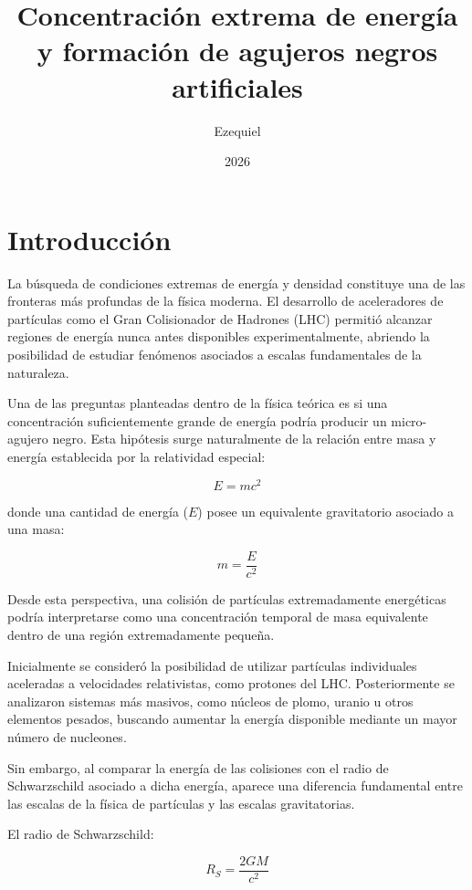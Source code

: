 \documentclass[a4paper,10pt,twocolumn]{article}
\title{Concentración extrema de energía y formación de agujeros negros artificiales}
\author{Ezequiel}
\date{2026}
\begin{document}
\maketitle

\section{Introducción}
La búsqueda de condiciones extremas de energía y densidad constituye una de las fronteras más profundas de la física moderna. El desarrollo de aceleradores de partículas como el Gran Colisionador de Hadrones (LHC) permitió alcanzar regiones de energía nunca antes disponibles experimentalmente, abriendo la posibilidad de estudiar fenómenos asociados a escalas fundamentales de la naturaleza.

Una de las preguntas planteadas dentro de la física teórica es si una concentración suficientemente grande de energía podría producir un micro-agujero negro. Esta hipótesis surge naturalmente de la relación entre masa y energía establecida por la relatividad especial:

\begin{equation}
E=mc^2
\end{equation}

donde una cantidad de energía ($E$) posee un equivalente gravitatorio asociado a una masa:

\begin{equation}
m=\frac{E}{c^2}
\end{equation}

Desde esta perspectiva, una colisión de partículas extremadamente energéticas podría interpretarse como una concentración temporal de masa equivalente dentro de una región extremadamente pequeña.

Inicialmente se consideró la posibilidad de utilizar partículas individuales aceleradas a velocidades relativistas, como protones del LHC. Posteriormente se analizaron sistemas más masivos, como núcleos de plomo, uranio u otros elementos pesados, buscando aumentar la energía disponible mediante un mayor número de nucleones.

Sin embargo, al comparar la energía de las colisiones con el radio de Schwarzschild asociado a dicha energía, aparece una diferencia fundamental entre las escalas de la física de partículas y las escalas gravitatorias.

El radio de Schwarzschild:

\begin{equation}
R_S=\frac{2GM}{c^2}
\end{equation}
\end{document}
